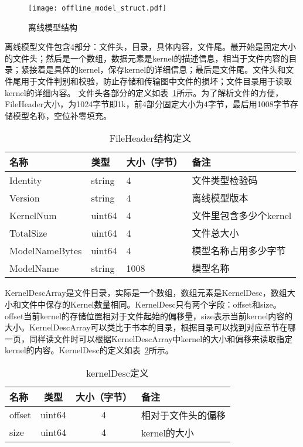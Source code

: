 \begin{figure}[htb]
  \centering
  \texttt{[image: offline\_model\_struct.pdf]}
  \caption{离线模型结构}
  \label{fig:offline-model-struct}
\end{figure}

离线模型文件包含4部分：文件头，目录，具体内容，文件尾。最开始是固定大小的文件头；然后是一个数组，数据元素是kernel的描述信息，相当于文件内容的目录；紧接着是具体的kernel，保存kernel的详细信息；最后是文件尾。文件头和文件尾用于文件判别和校验，防止存储和传输图中文件的损坏；文件目录用于读取kernel的详细内容。 
文件头各部分的定义如表~\ref{tab:file-header}所示。为了解析文件的方便，FileHeader大小，为1024字节即1k，前4部分固定大小为4字节，最后用1008字节存储模型名称，空位补零填充。

\begin{table}[htb]
  \centering\small
  \caption{FileHeader结构定义}
  \label{tab:file-header}
  \begin{tabular}{llll}
    \toprule
    名称          & 类型     & 大小（字节）   & 备注       \\
    \midrule
    Identity      & string  & 4    & 文件类型检验码  \\
    Version       & string  & 4    & 离线模型版本 \\
    KernelNum     & uint64  & 4    & 文件里包含多少个kernel  \\
    TotalSize     & uint64  & 4    & 文件总大小  \\
    ModelNameBytes& uint64  & 4    & 模型名称占用多少字节  \\
    ModelName     & string  & 1008 & 模型名称  \\
    \bottomrule
  \end{tabular}
\end{table}

KernelDescArray是文件目录，实际是一个数组，数组元素是KernelDesc，数组大小和文件中保存的Kernel数量相同。KernelDesc只有两个字段：offset和size。offset当前kernel的存储位置相对于文件起始的偏移量，size表示当前kernel内容的大小。KernelDescArray可以类比于书本的目录，根据目录可以找到对应章节在哪一页，同样读文件时可以根据KernelDescArray中kernel的大小和偏移来读取指定kernel的内容。KernelDesc的定义如表~\ref{tab:kernel-desc}所示。

\begin{table}[htb]
  \centering\small
  \caption{kernelDesc定义}
  \label{tab:kernel-desc}
  \begin{tabular}{lccl}
    \toprule
    名称      & 类型     & 大小（字节）   & 备注       \\
    \midrule
    offset    & uint64  & 4    & 相对于文件头的偏移  \\
    size      & uint64  & 4    & kernel的大小 \\
    \bottomrule
  \end{tabular}
\end{table}

